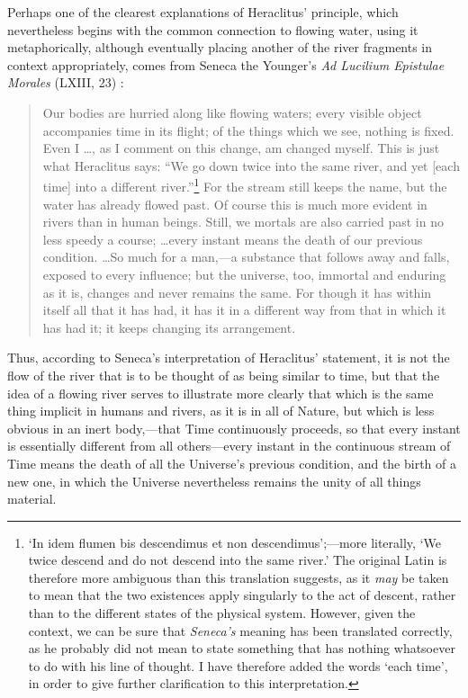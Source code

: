 Perhaps one of the clearest explanations of Heraclitus' principle, which nevertheless begins with the common connection to flowing water, using it metaphorically, although eventually placing another of the river fragments in context appropriately, comes from Seneca the Younger's \textit{Ad Lucilium Epistulae Morales} (LXIII, 23) \cite{Seneca1917}:
\begin{quotation}
Our bodies are hurried along like flowing waters; every visible object accompanies time in its flight; of the things which we see, nothing is fixed. Even I \ldots, as I comment on this change, am changed myself. This is just what Heraclitus says: ``We go down twice into the same river, and yet [each time] into a different river.''\footnote{`In idem flumen bis descendimus et non descendimus';---more literally, `We twice descend and do not descend into the same river.' The original Latin is therefore more ambiguous than this translation suggests, as it \textit{may} be taken to mean that the two existences apply singularly to the act of descent, rather than to the different states of the physical system. However, given the context, we can be sure that \textit{Seneca's} meaning has been translated correctly, as he probably did not mean to state something that has nothing whatsoever to do with his line of thought. I have therefore added the words `each time', in order to give further clarification to this interpretation.} For the stream still keeps the name, but the water has already flowed past. Of course this is much more evident in rivers than in human beings. Still, we mortals are also carried past in no less speedy a course; \ldots every instant means the death of our previous condition. \ldots So much for a man,---a substance that follows away and falls, exposed to every influence; but the universe, too, immortal and enduring as it is, changes and never remains the same. For though it has within itself all that it has had, it has it in a different way from that in which it has had it; it keeps changing its arrangement. 
\end{quotation}
Thus, according to Seneca's interpretation of Heraclitus' statement, it is not the flow of the river that is to be thought of as being similar to time, but that the idea of a flowing river serves to illustrate more clearly that which is the same thing implicit in humans and rivers, as it is in all of Nature, but which is less obvious in an inert body,---that Time continuously proceeds, so that every instant is essentially different from all others---every instant in the continuous stream of Time means the death of all the Universe's previous condition, and the birth of a new one, in which the Universe nevertheless remains the unity of all things material.

